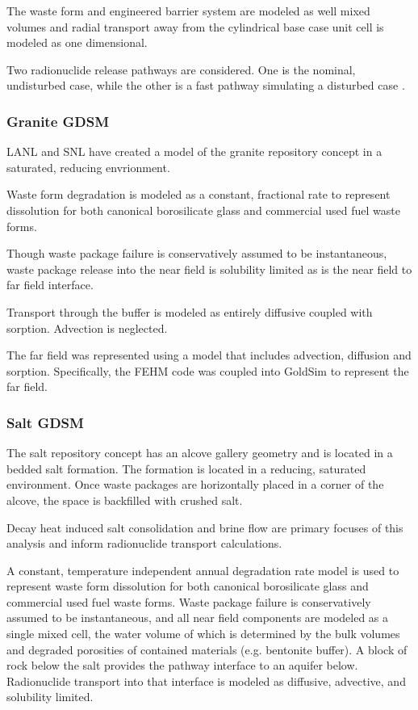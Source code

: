 {The waste form and engineered barrier system are modeled as well mixed volumes 
and radial transport away from the cylindrical base case unit cell is modeled as  
one dimensional.

Two radionuclide release pathways are considered. One is the nominal, undisturbed 
case, while the other is a fast pathway simulating a disturbed case
\cite{clayton_generic_2011}.


\subsubsection{Granite GDSM}

\gls{LANL} and \gls{SNL} have created a model of the granite repository concept  
in a saturated, reducing envrionment.

Waste form degradation is modeled as a constant, fractional rate to represent 
dissolution for both canonical borosilicate glass and commercial used fuel 
waste forms.  

Though waste package failure is conservatively assumed to be instantaneous,
waste package release into the near field is solubility limited as is the near 
field to far field interface. 

Transport through the buffer is modeled as entirely diffusive coupled with 
sorption. Advection is neglected.

The far field was represented using a model that includes advection, diffusion 
and sorption. Specifically, the \gls{FEHM} code was coupled into GoldSim to 
represent the far field.

\subsubsection{Salt GDSM}

The salt repository concept has an alcove gallery geometry and is located in a 
bedded salt formation. The formation is located in a reducing, saturated 
environment. Once waste packages  are horizontally placed in a corner of the 
alcove, the space is backfilled with crushed salt. 

Decay heat induced salt consolidation and brine flow are primary focuses of 
this analysis and inform radionuclide transport calculations. 

A constant, temperature independent annual degradation rate model is used to 
represent waste form dissolution for both canonical borosilicate glass and 
commercial used fuel waste forms. Waste package failure is conservatively 
assumed to be instantaneous, and all near field components are modeled as a 
single mixed cell, the water volume of which is determined by the bulk volumes 
and degraded porosities of contained materials (e.g. bentonite buffer). A block  
of rock below the salt provides the pathway interface to an aquifer below. 
Radionuclide transport into that interface is modeled as diffusive, advective, and 
solubility limited.

}
